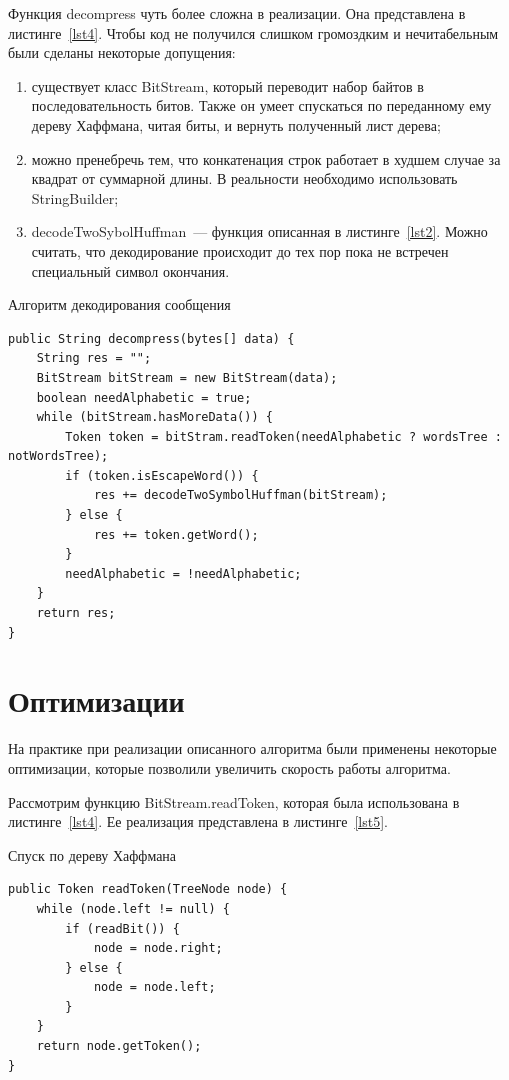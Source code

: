 Функция decompress чуть более сложна в реализации. Она представлена в листинге~\ref{lst4}. Чтобы код не получился слишком громоздким и нечитабельным
были сделаны некоторые допущения:
\begin{enumerate}
	\item существует класс BitStream, который переводит набор байтов в последовательность битов.
	Также он умеет спускаться по переданному ему дереву Хаффмана, читая биты, и вернуть полученный лист дерева;
	\item можно пренебречь тем, что конкатенация строк работает в худшем случае за квадрат от суммарной длины.
	В реальности необходимо использовать StringBuilder;
	\item decodeTwoSybolHuffman~--- функция описанная в листинге~\ref{lst2}. 
	Можно считать, что декодирование происходит до тех пор пока не встречен специальный символ окончания.
\end{enumerate}

\begin{algorithm}[!h]
\caption{Алгоритм декодирования сообщения}\label{lst4}
\begin{lstlisting}
public String decompress(bytes[] data) {
 	String res = "";
 	BitStream bitStream = new BitStream(data);
 	boolean needAlphabetic = true;
 	while (bitStream.hasMoreData()) {
 		Token token = bitStram.readToken(needAlphabetic ? wordsTree : notWordsTree);
 		if (token.isEscapeWord()) {
 			res += decodeTwoSymbolHuffman(bitStream);
 		} else {
 			res += token.getWord();
 		}
 		needAlphabetic = !needAlphabetic;
 	}
 	return res;
}
\end{lstlisting}
\end{algorithm}

\section{Оптимизации}

На практике при реализации описанного алгоритма были применены некоторые оптимизации, 
которые позволили увеличить скорость работы алгоритма.

Рассмотрим функцию BitStream.readToken, которая была использована в листинге~\ref{lst4}. Ее реализация представлена в листинге~\ref{lst5}.
\begin{algorithm}[!h]
\caption{Спуск по дереву Хаффмана}\label{lst5}
\begin{lstlisting}
public Token readToken(TreeNode node) {
 	while (node.left != null) {
 		if (readBit()) {
 			node = node.right;
 		} else {
 			node = node.left;
 		}
 	}
 	return node.getToken();
}
\end{lstlisting}
\end{algorithm}

